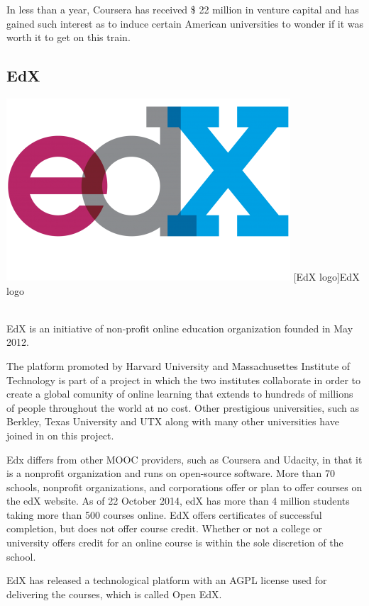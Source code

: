 In less than a year, Coursera has received \$ 22 million in venture capital and has gained such interest as to induce certain American universities to wonder if it was worth it to get on this train.

\subsection{EdX}
\label{subsec:EdX}
  \begin{minipage}{\linewidth}
      \centering
      \includegraphics[width=0.5\linewidth]{images/chapter1/edx_logo.png}
      [EdX logo]{EdX logo}
  \end{minipage}
\\

EdX is an initiative of non-profit online education organization founded in May 2012.

The platform promoted by Harvard University and Massachusettes Institute of Technology is part of a project in which the two institutes collaborate in order to create a global comunity of online learning that extends to hundreds of millions of people throughout the world at no cost. Other prestigious universities, such as Berkley, Texas University and UTX along with many other universities have joined in on this project.

Edx differs from other MOOC providers, such as Coursera and Udacity, in that it is a nonprofit organization and runs on open-source software.\cite{mooc_edx}
More than 70 schools, nonprofit organizations, and corporations offer or plan to offer courses on the edX website.
As of 22 October 2014, edX has more than 4 million students taking more than 500 courses online.\cite{mooc_edx}
EdX offers certificates of successful completion, but does not offer course credit. Whether or not a college or university offers credit for an online course is within the sole discretion of the school.\cite{mooc_edx}

EdX has released a technological platform with an AGPL license used for delivering the courses, which is called Open EdX.

